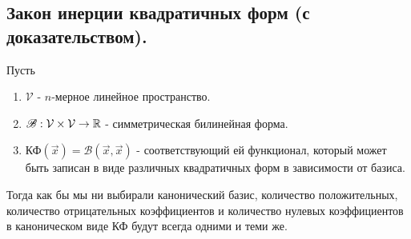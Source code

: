 \subsection{
    Закон инерции квадратичных форм (с доказательством).
}

\begin{theorem} Пусть
    \begin{enumerate}
        \item $\mathcal{V}$ - $n$-мерное линейное пространство.
        \item $\mathscr{B}: \mathcal{V} \times \mathcal{V} \to \mathbb{R}$ - симметрическая билинейная форма.
        \item $\text{КФ}(\vec{x}) = \mathscr{B}(\vec{x}, \vec{x})$ - соответствующий ей функционал, который может быть записан в виде различных квадратичных форм в зависимости от базиса.
    \end{enumerate}

    Тогда как бы мы ни выбирали канонический базис, количество положительных, количество отрицательных коэффициентов и количество нулевых коэффициентов в каноническом виде КФ будут всегда одними и теми же.
\end{theorem}

